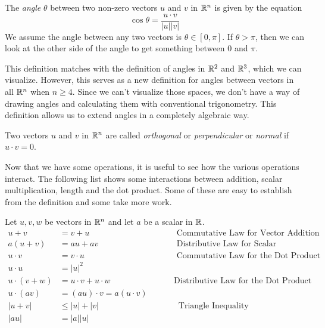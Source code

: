 \documentclass[fleqn,letterpaper]{report}
\begin{document}
\begin{defn}
The \emph{angle} $\theta$ between two non-zero vectors $u$ and
$v$ in $\mathbb{R}^n$ is given by the equation
\begin{equation*}
\cos \theta = \frac{u \cdot v}{|u||v|}
\end{equation*}
We assume the angle between any two vectors is $\theta \in [0,
\pi]$. If $\theta > \pi$, then we can look at the other side
of the angle to get something between $0$ and $\pi$. 
\end{defn}

This definition matches with the definition of angles in
$\mathbb{R}^2$ and $\mathbb{R}^3$, which we can visualize. However, this
serves as a new definition for angles between vectors in all
$\mathbb{R}^n$ when $n \geq 4$. Since we can't visualize those
spaces, we don't have a way of drawing angles and calculating
them with conventional trigonometry. This definition allows us
to extend angles in a completely algebraic way. 

\begin{defn}
Two vectors $u$ and $v$ in $\mathbb{R}^n$ are called \emph{orthogonal}
or \emph{perpendicular} or \emph{normal} if $u \cdot v = 0$. 
\end{defn}

Now that we have some operations, it is useful to see how the
various operations interact. The following list shows
some interactions between addition, scalar multiplication,
length and the dot product. Some of these are easy to
establish from the definition and some take more work.

\begin{prop}
Let $u,v,w$ be vectors in $\mathbb{R}^n$ and let $a$ be a scalar in $\mathbb{R}$.
\begin{displaymath}
\begin{array}{rll}
u + v & = v + u & \hspace{1cm} \text{ Commutative Law for
Vector Addition} \\
a (u+v) & = au + av & \hspace{1cm} \text{ Distributive Law for
Scalar Multiplication}\\
u \cdot v & = v \cdot u & \hspace{1cm} \text{ Commutative
Law for the Dot Product}\\
u \cdot u & = |u|^2 & \\
u \cdot (v+w) & = u \cdot v + u \cdot w & \hspace{1cm} \text{
Distributive Law for the Dot Product}\\
u \cdot (av) & = (au) \cdot v = a (u \cdot v) \\
|u+v| & \leq |u| + |v| & \hspace{1cm} \ \text{ Triangle Inequality} \\
|au| & = |a||u| & 
\end{array}
\end{displaymath}
\end{prop}
\end{document}
